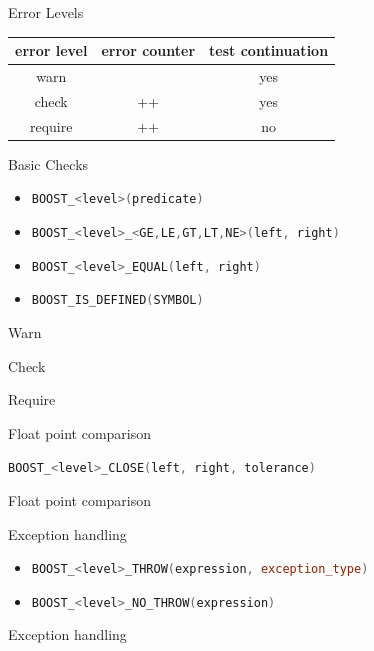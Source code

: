 \documentclass{beamer}
\newcommand{\inlinecpp}[1]{
    \lstinline[language=C++]{#1}
}
\begin{document}
        \begin{frame}{Error Levels}
            \begin{tabular}{c|c|c}
                error level &   error counter   &   test continuation   \\
                \hline
                warn    &       &   yes  \\
                check   &   ++  &   yes \\
                require &   ++  &   no  \\
            \end{tabular}
        \end{frame}

        \begin{frame}{Basic Checks}
            \begin{itemize}
                \item  \inlinecpp{BOOST_<level>(predicate)}
                \item  \inlinecpp{BOOST_<level>_<GE,LE,GT,LT,NE>(left, right)}
                \item  \inlinecpp{BOOST_<level>_EQUAL(left, right)}
                \item  \inlinecpp{BOOST_IS_DEFINED(SYMBOL)}
            \end{itemize}
        \end{frame}
        \begin{frame}{Warn}
            
        \end{frame}
        \begin{frame}{Check}
            
        \end{frame}
        \begin{frame}{Require}
            
        \end{frame}

        \begin{frame}{Float point comparison}
            \inlinecpp{BOOST_<level>_CLOSE(left, right, tolerance)}
        \end{frame}
        \begin{frame}{Float point comparison}
            
        \end{frame}

        \begin{frame}{Exception handling}
            \begin{itemize}
                \item  \inlinecpp{BOOST_<level>_THROW(expression, exception_type)}
                \item  \inlinecpp{BOOST_<level>_NO_THROW(expression)}
            \end{itemize}
        \end{frame}
        \begin{frame}{Exception handling}
                  
        \end{frame}
\end{document}
